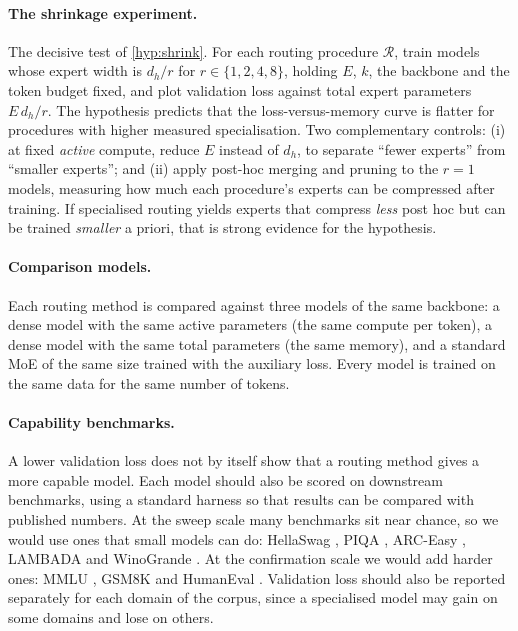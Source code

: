 \documentclass[10pt]{article}
\theoremstyle{definition}
\theoremstyle{remark}
\begin{document}
\paragraph{The shrinkage experiment.}
\label{sec:shrinkage}
The decisive test of \cref{hyp:shrink}. For each routing procedure $\mathcal{R}$, train models whose expert width is $d_h/r$ for $r\in\{1,2,4,8\}$, holding $E$, $k$, the backbone and the token budget fixed, and plot validation loss against total expert parameters $E\,d_h/r$. The hypothesis predicts that the loss-versus-memory curve is flatter for procedures with higher measured specialisation. Two complementary controls: (i) at fixed \emph{active} compute, reduce $E$ instead of $d_h$, to separate ``fewer experts'' from ``smaller experts''; and (ii) apply post-hoc merging \citep{li2024mcsmoe} and pruning \citep{lu2024notall} to the $r=1$ models, measuring how much each procedure's experts can be compressed after training. If specialised routing yields experts that compress \emph{less} post hoc but can be trained \emph{smaller} a priori, that is strong evidence for the hypothesis.

\paragraph{Comparison models.} Each routing method is compared against three models of the same backbone: a dense model with the same active parameters (the same compute per token), a dense model with the same total parameters (the same memory), and a standard MoE of the same size trained with the auxiliary loss. Every model is trained on the same data for the same number of tokens.

\paragraph{Capability benchmarks.} A lower validation loss does not by itself show that a routing method gives a more capable model. Each model should also be scored on downstream benchmarks, using a standard harness \citep{gao2024harness} so that results can be compared with published numbers. At the sweep scale many benchmarks sit near chance, so we would use ones that small models can do: HellaSwag \citep{zellers2019hellaswag}, PIQA \citep{bisk2020piqa}, ARC-Easy \citep{clark2018arc}, LAMBADA \citep{paperno2016lambada} and WinoGrande \citep{sakaguchi2020winogrande}. At the confirmation scale we would add harder ones: MMLU \citep{hendrycks2021mmlu}, GSM8K \citep{cobbe2021gsm8k} and HumanEval \citep{chen2021codex}. Validation loss should also be reported separately for each domain of the corpus, since a specialised model may gain on some domains and lose on others.
\end{document}
